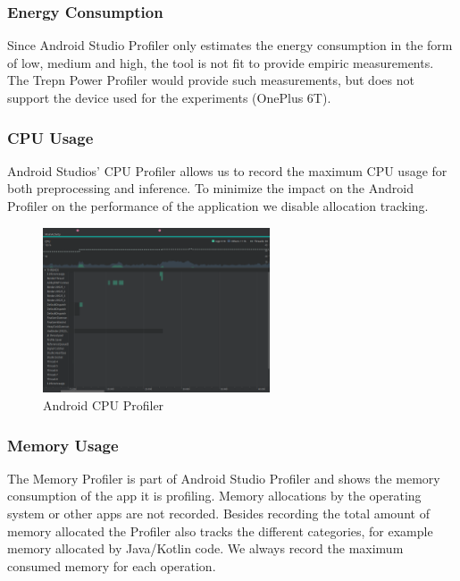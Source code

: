 \subsubsection{Energy Consumption}
Since Android Studio Profiler only estimates the energy consumption in the form of low, medium and high, the tool is not fit to provide empiric measurements. The Trepn Power Profiler would provide such measurements, but does not support the device used for the experiments (OnePlus 6T).
\subsubsection{CPU Usage}
Android Studios’ CPU Profiler allows us to record the maximum CPU usage for both preprocessing and inference. To minimize the impact on the Android Profiler on the performance of the application we disable allocation tracking.
\begin{figure}[H]
\centering  
\includegraphics[width=0.6\textwidth]{./Bilder/profiler_CPU}
\caption{Android CPU Profiler}
\label{fig:prof_cpu}
\end{figure}
\subsubsection{Memory Usage}
The Memory Profiler is part of Android Studio Profiler and shows the memory consumption of the app it is profiling. Memory allocations by the operating system or other apps are not recorded. Besides recording the total amount of memory allocated the Profiler also tracks the different categories, for example memory allocated by Java/Kotlin code. We always record the maximum consumed memory for each operation.

